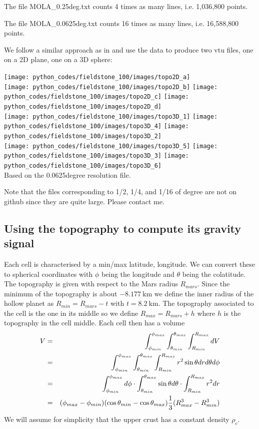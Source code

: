 The file {\filenamefont MOLA\_0.25deg.txt} counts 4 times as many lines, 
i.e. 1,036,800 points.

The file {\filenamefont MOLA\_0.0625deg.txt} counts 16 times as many lines, 
i.e. 16,588,800 points.

We follow a similar approach as in  and use the data to produce 
two vtu files, one on a 2D plane, one on a 3D sphere:

\begin{center}
\texttt{[image: python\_codes/fieldstone\_100/images/topo2D\_a]}\\
\texttt{[image: python\_codes/fieldstone\_100/images/topo2D\_b]}
\texttt{[image: python\_codes/fieldstone\_100/images/topo2D\_c]}
\texttt{[image: python\_codes/fieldstone\_100/images/topo2D\_d]}\\
\texttt{[image: python\_codes/fieldstone\_100/images/topo3D\_1]}
\texttt{[image: python\_codes/fieldstone\_100/images/topo3D\_4]}
\texttt{[image: python\_codes/fieldstone\_100/images/topo3D\_2]}\\
\texttt{[image: python\_codes/fieldstone\_100/images/topo3D\_5]}
\texttt{[image: python\_codes/fieldstone\_100/images/topo3D\_3]}
\texttt{[image: python\_codes/fieldstone\_100/images/topo3D\_6]}\\
{\captionfont Based on the 0.0625degree resolution file.}
\end{center}

Note that the files corresponding to 1/2, 1/4, and 1/16 of degree are not on github since they are quite large. 
Please contact me.

\subsection*{Using the topography to compute its gravity signal}

Each cell is characterised by a min/max latitude, longitude. We can convert these to 
spherical coordinates with $\phi$ being the longitude and $\theta$ being the colatitude.
The topography is given with respect to the Mars radius $R_{mars}$. Since the minimum 
of the topography is about $-8.177~\si{\km}$ we define the inner radius of the hollow planet 
as $R_{min}=R_{mars}-t$ with $t=8.2~\si{\km}$. The topography associated to the cell 
is the one in its middle so we define $R_{max}=R_{mars}+h$ where $h$ is the topography 
in the cell middle. Each cell then has a volume
\begin{eqnarray}
V
&=&
\int_{\phi_{min}}^{\phi_{max}}
\int_{\theta_{min}}^{\theta_{max}}
\int_{R_{min}}^{R_{max}}
dV \nonumber\\
&=&
\int_{\phi_{min}}^{\phi_{max}}
\int_{\theta_{min}}^{\theta_{max}}
\int_{R_{min}}^{R_{max}}
r^2 \sin\theta dr d\theta d\phi \nonumber\\
&=&
\int_{\phi_{min}}^{\phi_{max}} d\phi \cdot
\int_{\theta_{min}}^{\theta_{max}} \sin\theta d\theta \cdot 
\int_{R_{min}}^{R_{max}} r^2 dr\nonumber\\
&=&
(\phi_{max} -\phi_{min})
(\cos \theta_{min} -\cos\theta_{max})
\frac13 (R_{max}^3-R_{min}^3)
\end{eqnarray}
We will assume for simplicity that the upper crust has a constant density $\rho_c$. 

